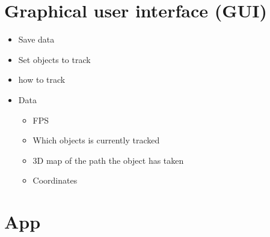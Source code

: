 \documentclass[11pt]{article}
\begin{document}
\newpage
\section*{Graphical user interface (GUI)}

    \begin{itemize}

        \item Save data
        \item Set objects to track
        \item how to track
        \item Data
          \begin{itemize}
            \item FPS
            \item Which objects is currently tracked
            \item 3D map of the path the object has taken
            \item Coordinates
          \end{itemize}

    \end{itemize}

\section*{App}
\end{document}
